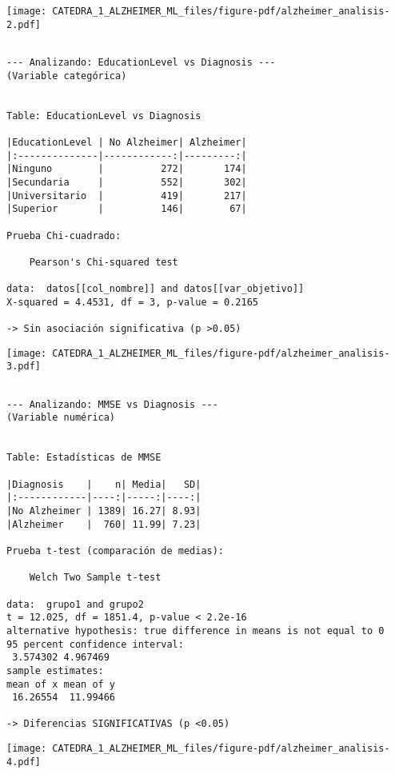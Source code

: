 \documentclass[
  letterpaper,
  DIV=11,
  numbers=noendperiod]{scrartcl}
\begin{document}
\begin{center}
\texttt{[image: CATEDRA\_1\_ALZHEIMER\_ML\_files/figure-pdf/alzheimer\_analisis-2.pdf]}
\end{center}

\begin{verbatim}

--- Analizando: EducationLevel vs Diagnosis ---
(Variable categórica)


Table: EducationLevel vs Diagnosis

|EducationLevel | No Alzheimer| Alzheimer|
|:--------------|------------:|---------:|
|Ninguno        |          272|       174|
|Secundaria     |          552|       302|
|Universitario  |          419|       217|
|Superior       |          146|        67|

Prueba Chi-cuadrado:

    Pearson's Chi-squared test

data:  datos[[col_nombre]] and datos[[var_objetivo]]
X-squared = 4.4531, df = 3, p-value = 0.2165

-> Sin asociación significativa (p >0.05)
\end{verbatim}

\begin{center}
\texttt{[image: CATEDRA\_1\_ALZHEIMER\_ML\_files/figure-pdf/alzheimer\_analisis-3.pdf]}
\end{center}

\begin{verbatim}

--- Analizando: MMSE vs Diagnosis ---
(Variable numérica)


Table: Estadísticas de MMSE

|Diagnosis    |    n| Media|   SD|
|:------------|----:|-----:|----:|
|No Alzheimer | 1389| 16.27| 8.93|
|Alzheimer    |  760| 11.99| 7.23|

Prueba t-test (comparación de medias):

    Welch Two Sample t-test

data:  grupo1 and grupo2
t = 12.025, df = 1851.4, p-value < 2.2e-16
alternative hypothesis: true difference in means is not equal to 0
95 percent confidence interval:
 3.574302 4.967469
sample estimates:
mean of x mean of y 
 16.26554  11.99466 

-> Diferencias SIGNIFICATIVAS (p <0.05)
\end{verbatim}

\begin{center}
\texttt{[image: CATEDRA\_1\_ALZHEIMER\_ML\_files/figure-pdf/alzheimer\_analisis-4.pdf]}
\end{center}
\end{document}
